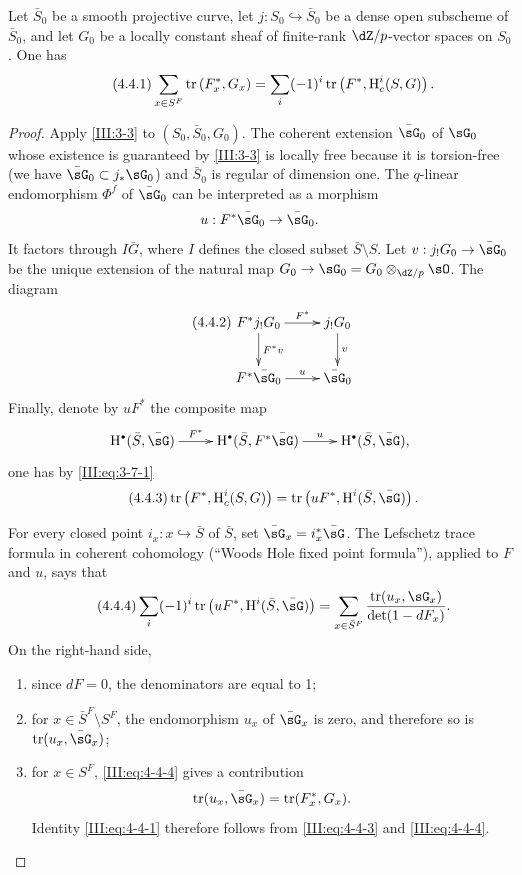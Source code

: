 \begin{theorem_}\label{III:4-1bis}
Let $\bar S_0$ be a smooth projective curve, let
$j:S_0\hookrightarrow \bar S_0$ be a dense open subscheme of $\bar S_0$,
and let $G_0$ be a locally constant sheaf of finite-rank $\dZ/p$-vector
spaces on $S_0$. One has
\begin{equation*}\tag{4.4.1}\label{III:eq:4-4-1}
  \sum_{x\in S^F} \operatorname{tr}\left(F_x^*,G_x\right) = \sum_i (-1)^i \operatorname{tr}\left(F^*,\operatorname{H}_c^i(S,G)\right) \text{.}
\end{equation*}
\end{theorem_}
\begin{proof}
Apply \ref{III:3-3} to $(S_0,\bar S_0,G_0)$. The coherent extension
$\bar\sG_0$ of $\sG_0$ whose existence is guaranteed by \ref{III:3-3} is
locally free because it is torsion-free (we have
$\bar\sG_0\subset j_*\sG_0$) and $\bar S_0$ is regular of dimension one. The
$q$-linear endomorphism $\Phi^f$ of $\bar\sG_0$ can be interpreted as a
morphism
\[
  u : F^*\bar\sG_0 \to \bar\sG_0 \text{.}
\]
It factors through $I\bar G$, where $I$ defines the closed subset
$\bar S\setminus S$. Let $v:j_!G_0 \to \bar\sG_0$ be the unique extension of
the natural map $G_0 \to \sG_0 = G_0\otimes_{\dZ/p}\sO$. The diagram
\begin{equation*}\tag{4.4.2}\label{III:eq:4-4-2}
\xymatrix{
  F^* j_! G_0 \ar[r]^-{F^*} \ar[d]^-{F^* v}
    & j_! G_0 \ar[d]^-v \\
  F^*\bar \sG_0 \ar[r]^-u
    & \bar\sG_0
}
\end{equation*}
Finally, denote by $u F^*$ the composite map
\[\xymatrix{
  \h^\bullet(\bar S,\bar\sG) \ar[r]^-{F^*}
    & \h^\bullet(\bar S,F^*\bar\sG) \ar[r]^-u
    & \h^\bullet(\bar S,\bar\sG) \text{,}
}\]
one has by \eqref{III:eq:3-7-1}
\begin{equation*}\tag{4.4.3}\label{III:eq:4-4-3}
  \tr\left(F^*,\h_c^i(S,G)\right) = \tr\left(u F^*,\h^i(\bar S,\bar\sG)\right) \text{.}
\end{equation*}

For every closed point $i_x:x\hookrightarrow \bar S$ of $\bar S$, set
$\bar\sG_x = i_x^*\bar\sG$. The Lefschetz trace formula in coherent
cohomology (``Woods Hole fixed point formula''), applied to $F$ and $u$, says
that
\begin{equation*}\tag{4.4.4}\label{III:eq:4-4-4}
  \sum_i (-1)^i \tr\left(uF^*, \h^i(\bar S,\bar\sG)\right) = \sum_{x\in \bar S^F} \frac{\tr(u_x,\sG_x)}{\det(1-d F_x)} \text{.}
\end{equation*}
On the right-hand side,
\begin{enumerate}[\indent a)]
  \item since $d F=0$, the denominators are equal to 1;
  \item for $x\in \bar S^F\setminus S^F$, the endomorphism $u_x$ of
    $\bar\sG_x$ is zero, and therefore so is $\tr(u_x,\bar\sG_x)$;
  \item for $x\in S^F$, \eqref{III:eq:4-4-4} gives a contribution
    \[
      \tr(u_x,\bar\sG_x) = \tr(F_x^*,G_x) \text{.}
    \]
    Identity \eqref{III:eq:4-4-1} therefore follows from
    \eqref{III:eq:4-4-3} and \eqref{III:eq:4-4-4}.
\end{enumerate}
\end{proof}
